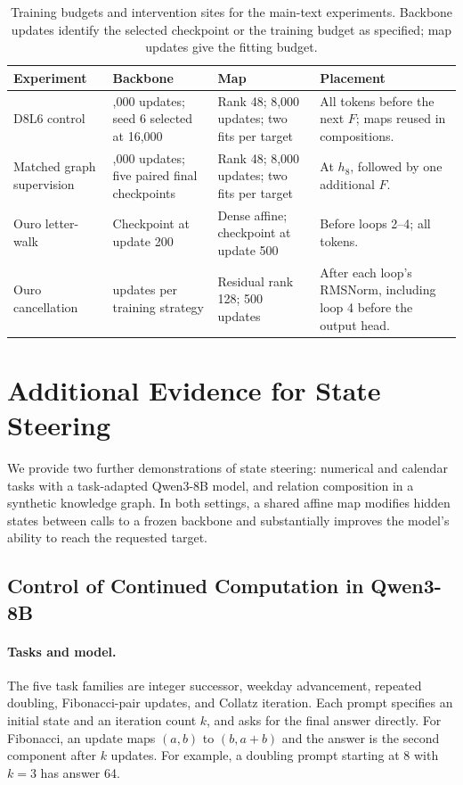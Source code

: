 \documentclass{article}
\begin{document}
\begin{table}[!htbp]
\centering
\caption{Training budgets and intervention sites for the main-text experiments. Backbone updates identify the selected checkpoint or the training budget as specified; map updates give the fitting budget.}
\label{tab:training-summary}
\setlength{\tabcolsep}{3pt}
\begin{tabular}{@{}>{\raggedright\arraybackslash}p{.22\linewidth}>{\raggedright\arraybackslash}p{.24\linewidth}>{\raggedright\arraybackslash}p{.18\linewidth}>{\raggedright\arraybackslash}p{.28\linewidth}@{}}\toprule
Experiment & Backbone & Map & Placement\\\midrule
D8L6 control & 20,000 updates; seed 6 selected at 16,000 & Rank 48; 8,000 updates; two fits per target & All tokens before the next $F$; maps reused in compositions.\\
Matched graph supervision & 20,000 updates; five paired final checkpoints & Rank 48; 8,000 updates; two fits per target & At $h_8$, followed by one additional $F$.\\
Ouro letter-walk & Checkpoint at update 200 & Dense affine; checkpoint at update 500 & Before loops 2--4; all tokens.\\
Ouro cancellation & 500 updates per training strategy & Residual rank 128; 500 updates & After each loop's RMSNorm, including loop 4 before the output head.\\
\bottomrule\end{tabular}
\end{table}

\FloatBarrier
\clearpage
\section{Additional Evidence for State Steering}
\label{app:additional-control}
We provide two further demonstrations of state steering: numerical and calendar tasks with a task-adapted Qwen3-8B model, and relation composition in a synthetic knowledge graph. In both settings, a shared affine map modifies hidden states between calls to a frozen backbone and substantially improves the model's ability to reach the requested target.

\subsection{Control of Continued Computation in Qwen3-8B}
\label{app:qwen-control}

\paragraph{Tasks and model.}
The five task families are integer successor, weekday advancement, repeated doubling, Fibonacci-pair updates, and Collatz iteration. Each prompt specifies an initial state and an iteration count $k$, and asks for the final answer directly. For Fibonacci, an update maps $(a,b)$ to $(b,a+b)$ and the answer is the second component after $k$ updates. For example, a doubling prompt starting at 8 with $k=3$ has answer 64.
\end{document}
